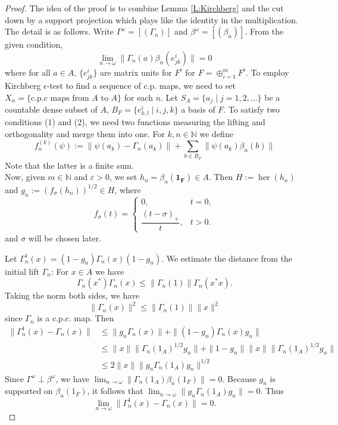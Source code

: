 \documentclass[12pt]{amsart}
\theoremstyle{plain}
\theoremstyle{definition}
\def\her{\operatorname{her}}
\numberwithin{equation}{section}
\begin{document}
\begin{proof}
The idea of the proof is to combine Lemma \ref{L:Kirchberg} and the cut down by a support projection which plays like the identity in the multiplication. The detail is as follows. 
Write $\Gamma^{\omega}=[(\Gamma_n)]$ and $\beta^{\omega}=[(\beta_n)]$. From the given condition, 
\begin{equation} 
\lim_{n \to \omega} \|\Gamma_n(a)\beta_n(e^i_{jk})\|=0 
\end{equation}
where for all $a \in A$, $\{e^{i}_{jk}\}$ are matrix units for $F^i$ for $F=\oplus_{i=1}^m F^i$. 
To employ Kirchberg $\epsilon$-test to find a sequence of c.p. maps, we need to set $X_n=\{ \text{c.p.c maps from $A$ to $A$}\}$ for each $n$.  Let $S_A=\{ a_j  \mid  j=1,2, \dots\}$ be a countable dense subset of $A$, $B_F=\{ e^{i}_{k,l} \mid i, j, k\}$ a basis of  $F$. To satisfy two conditions (1) and (2), we need two functions measuring the lifting and orthogonality and merge them into one. For $k, n \in \mathbb{N}$ we define 
 \[ f^{(k)}_n(\psi):= \|\psi(a_k)-\Gamma_n(a_k) \| + \sum_{b \in B_F } \| \psi(a_k)\beta_n(b)\| \] Note that the latter is a finite sum. \\
 Now, given $m\in \mathbb{N}$ and $\varepsilon >0$, we set $h_n=\beta_n(\mathbf{1_F}) \in A$. Then $H:=\her (h_n)$ and    $g_n:=(f_\sigma(h_n))^{1/2} \in H$, where
\[
f_\sigma(t)=
\begin{cases}
0,& t=0,\\
\dfrac{(t-\sigma)_+}{t},& t > 0.
\end{cases}
\] and  $\sigma$ will be chosen later.  

    Let $\Gamma^1_{n}(x) = (1 - g_n) \Gamma_n(x) (1 - g_n)$. We estimate the distance from the initial lift $\Gamma_n$: 
  For $x\in A$ we have \[ \Gamma_n(x^*)\Gamma_n(x) \le \|\Gamma_n(1)\| \Gamma_n(x^*x).\]
    Taking the norm both sides, we have 
    \[ \|\Gamma_n(x) \|^2 \le \| \Gamma_n(1)\|\|x\|^2 \]
    since $\Gamma_n$ is a c.p.c. map. Then 
    \begin{align*}
    \|\Gamma^1_{n}(x) - \Gamma_n(x)\| &\le \|g_n \Gamma_n(x)\| + \|(1-g_n) \Gamma_n(x) g_n\| \\
    &\le \|x\| \|\Gamma_n(1_A)^{1/2} g_n\| + \|1-g_n\| \|x\| \|\Gamma_n(1_A)^{1/2} g_n\| \\
    &\le 2 \|x\| \|g_n \Gamma_n(1_A) g_n\|^{1/2}
    \end{align*}
    Since $\Gamma^{\omega} \perp \beta^{\omega}$, we have $\lim_{n \to \omega} \| \Gamma_n(1_A) \beta_n(1_F) \| = 0$. Because $g_n$ is supported on $\beta_n(1_F)$, it follows that $\lim_{n \to \omega} \|g_n \Gamma_n(1_A) g_n\| = 0$.  Thus  
    \[ \lim_{n \to \omega}\|\Gamma^1_{n}(x) - \Gamma_n(x)\|=0. \]


\end{proof}
\end{document}
